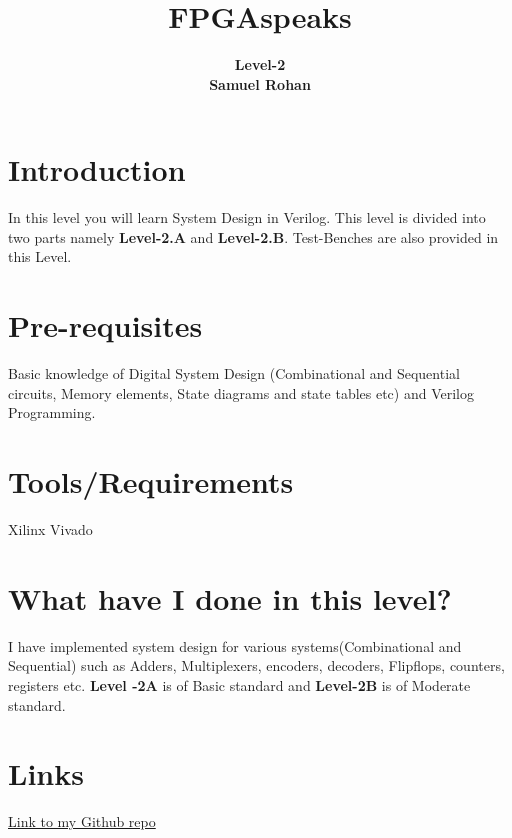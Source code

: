 \documentclass{article}
\title{\huge{\textbf{FPGAspeaks}}}
\author{\textbf{Level-2}\\  \textbf{Samuel Rohan}}
\date{}
\begin{document}
\maketitle
\tableofcontents
\section{Introduction}
\begin{enumerate}
In this level you will learn System Design in Verilog. This level is divided into two parts namely
\textbf{Level-2.A} and \textbf{Level-2.B}. Test-Benches are also provided in this Level.
\end{enumerate}
\section{Pre-requisites}
\begin{enumerate}
Basic knowledge of Digital System Design (Combinational and Sequential circuits, Memory elements, State diagrams and state tables etc) and Verilog Programming.
\end{enumerate}
\section{Tools/Requirements}
\begin{enumerate}
Xilinx Vivado
\end{enumerate}
\section{What have I done in this level?}
\begin{enumerate}
I have implemented system design for various systems(Combinational and Sequential) such as Adders, Multiplexers, encoders, decoders, Flipflops, counters, registers etc. \textbf{Level -2A} is of Basic standard and \textbf{Level-2B} is of Moderate standard. 
\end{enumerate}
\section{Links}
\begin{enumerate}
\href{https://github.com/rohann-9/FPGAspeaks/tree/main/Level%20-%202}{Link to my Github repo}
\end{enumerate}
\end{document}
